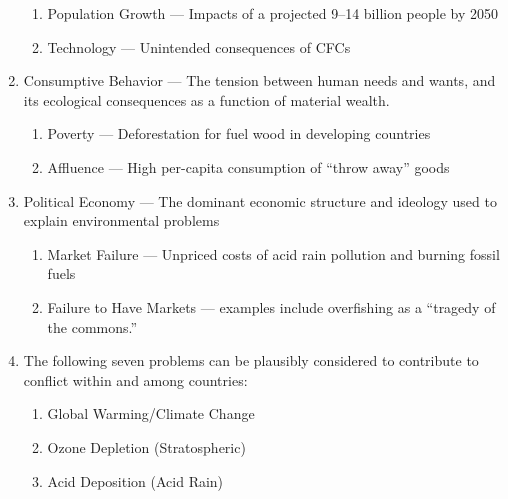 \documentclass[12pt]{article}
\begin{document}
\begin{enumerate}
\begin{enumerate}
          \item Population Growth — Impacts of a projected 9–14 billion people by 2050

          \item Technology — Unintended consequences of CFCs

        \end{enumerate}

      \item Consumptive Behavior — The tension between human needs and wants, and its ecological consequences as a function of material wealth. 

        \begin{enumerate}

          \item Poverty — Deforestation for fuel wood in developing countries

          \item Affluence — High per-capita consumption of “throw away” goods

        \end{enumerate}

      \item Political Economy — The dominant economic structure and ideology used to explain environmental problems

        \begin{enumerate}
            
          \item Market Failure — Unpriced costs of acid rain pollution and burning fossil fuels
            
          \item Failure to Have Markets — examples include overfishing as a “tragedy of the commons.”

        \end{enumerate}

      \item The following seven problems can be plausibly considered to contribute to conflict within and among countries:

        \begin{enumerate}

          \item Global Warming/Climate Change

          \item Ozone Depletion (Stratospheric)

          \item Acid Deposition (Acid Rain)


\end{enumerate}
\end{enumerate}
\end{document}
